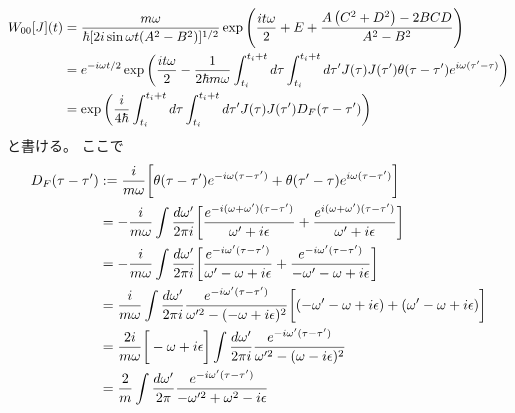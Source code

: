 \begin{align}
    W_{00}[J](t)
    &=
    \dfrac{m \omega}{
        \hbar
        [
            2 i \sin \omega t 
            (A^2 - B^2)
        ]^{1 / 2}
    }
    \exp\left(
        \dfrac{i t \omega}{2}
        +
        E
        +
        \dfrac{
            A
            \left(
                C^2 + D^2
            \right)
        -
            2 BCD
        }{
            A^2 - B^2
        }
    \right)
\notag\\&
    =
    e^{ - i \omega t / 2 }
    \exp\bigg(
        \dfrac{i t \omega}{2}
        -
        \dfrac{1}{2 \hbar m \omega}
        \int_{t_i}^{t_i + t}
            d\tau
        \int_{t_i}^{t_i + t}
            d\tau'
        J(\tau) J(\tau')
        \theta(\tau - \tau')
            e^{ i \omega (\tau' - \tau) }
    \bigg)
\notag\\&
    =
    \exp\bigg(
        \dfrac{i}{4 \hbar}
        \int_{t_i}^{t_i + t}
            d\tau
        \int_{t_i}^{t_i + t}
            d\tau'
        J(\tau) J(\tau')
            D_F (\tau - \tau')
    \bigg)
\label{generating functional of harmonic oscillator}
\end{align}
と書ける。
ここで
\begin{align}
    D_F (\tau - \tau')
    &:=
    \dfrac{ i }{m \omega}
    \bigg[
        \theta(\tau - \tau')
        e^{ - i \omega (\tau - \tau') }
    +
        \theta(\tau' - \tau)
        e^{ i \omega (\tau - \tau') }
    \bigg]
\notag\\&=
    -
    \dfrac{ i }{m \omega}
    \int
        \dfrac{d \omega'}{2 \pi i}
    \bigg[
        \dfrac{
            e^{ - i (\omega + \omega') (\tau - \tau') }
        }{\omega' + i \epsilon}
    +
        \dfrac{
            e^{ i (\omega + \omega') (\tau - \tau') }
        }{\omega' + i \epsilon}
    \bigg]
\notag\\&=
    -
    \dfrac{ i }{m \omega}
    \int
        \dfrac{d \omega'}{2 \pi i}
    \bigg[
        \dfrac{
            e^{ - i \omega' (\tau - \tau') }
        }{\omega' - \omega + i \epsilon}
    +
        \dfrac{
            e^{ - i \omega' (\tau - \tau') }
        }{- \omega' - \omega + i \epsilon}
    \bigg]
\notag\\&=
    \dfrac{ i }{m \omega}
    \int
        \dfrac{d \omega'}{2 \pi i}
        \dfrac{
            e^{ - i \omega' (\tau - \tau') }
        }{\omega'^2 - (- \omega + i \epsilon)^2}
    \bigg[
        (- \omega' - \omega + i \epsilon)
    +
        (\omega' - \omega + i \epsilon)
    \bigg]
\notag\\&=
    \dfrac{ 2 i }{m \omega}
    \bigg[
        - \omega + i \epsilon
    \bigg]
    \int
        \dfrac{d \omega'}{2 \pi i}
        \dfrac{
            e^{ - i \omega' (\tau - \tau') }
        }{\omega'^2 - (\omega - i \epsilon)^2}
\notag\\&=
    \dfrac{2}{m}
    \int
        \dfrac{d \omega'}{2 \pi}
        \dfrac{
            e^{ - i \omega' (\tau - \tau') }
        }{- \omega'^2 + \omega^2 - i \epsilon}
\end{align}
